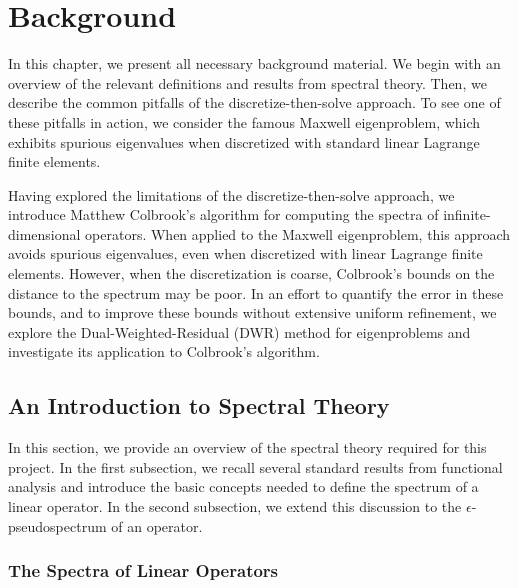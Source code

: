 \chapter{Background}

In this chapter, we present all necessary background material. We begin with an overview of the relevant definitions and results from spectral theory. Then, we describe the common pitfalls of the discretize-then-solve approach. To see one of these pitfalls in action, we consider the famous Maxwell eigenproblem, which exhibits spurious eigenvalues when discretized with standard linear Lagrange finite elements. 

Having explored the limitations of the discretize-then-solve approach, we introduce Matthew Colbrook's algorithm for computing the spectra of infinite-dimensional operators. When applied to the Maxwell eigenproblem, this approach avoids spurious eigenvalues, even when discretized with linear Lagrange finite elements. However, when the discretization is coarse, Colbrook's bounds on the distance to the spectrum may be poor. In an effort to quantify the error in these bounds, and to improve these bounds without extensive uniform refinement, we explore the Dual-Weighted-Residual (DWR) method for eigenproblems and investigate its application to Colbrook's algorithm. 

\section{An Introduction to Spectral Theory}

In this section, we provide an overview of the spectral theory required for this project. In the first subsection, we recall several standard results from functional analysis and introduce the basic concepts needed to define the spectrum of a linear operator. In the second subsection, we extend this discussion to the $\epsilon$-pseudospectrum of an operator. 


\subsection{The Spectra of Linear Operators}


